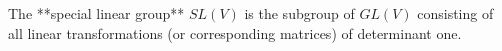 The **special linear group** $SL(V)$ is the subgroup of $GL(V)$ consisting of all linear transformations (or corresponding matrices) of determinant one.
